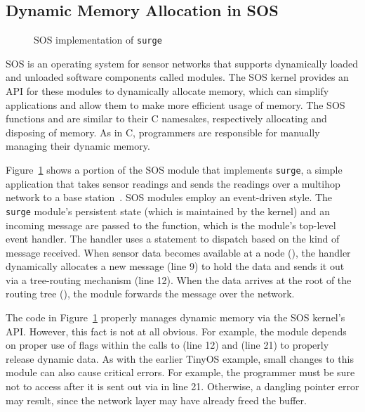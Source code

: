 \subsection{Dynamic Memory Allocation in SOS}



\begin{figure}[t]

\caption{SOS implementation of {\tt surge}\label{fig:surge}}
\end{figure}



SOS is an operating system for sensor networks that supports dynamically
loaded and unloaded software components called modules.
%
The SOS kernel provides an API for these modules to dynamically allocate
memory, which can simplify applications and allow them to make more
efficient usage of memory.
%
The SOS functions  and  are similar to
their C namesakes, respectively allocating and disposing of memory.  
%
As in C, programmers are responsible for manually managing their dynamic
memory.  



Figure~\ref{fig:surge} shows a portion of the SOS module that implements
{\tt surge}, a simple application that takes sensor readings and sends the
readings over a multihop network to a base station~\cite{nesC}.  
%
SOS modules employ an event-driven style.  
%
The {\tt surge} module's persistent state (which is maintained by the
kernel) and an incoming message are passed to the 
function, which is the module's top-level event handler.  
%
The handler uses a  statement to dispatch based on the kind of
message received.  
%
When sensor data becomes available at a node (), the
handler dynamically allocates a new message (line 9) to hold the data and
sends it out via a tree-routing mechanism (line 12).  
%
When the data arrives at the root of the routing tree
(), the module forwards the message over the
network.



The code in Figure~\ref{fig:surge} properly manages dynamic memory via the
SOS kernel's API.  
%
However, this fact is not at all obvious.  
%
For example, the module depends on proper use of flags within the calls to
 (line 12) and  (line 21) to properly
release dynamic data.
%
As with the earlier TinyOS example, small changes to this module can also
cause critical errors.  
%
For example, the programmer must be sure not to access  after
it is sent out via  in line 21.  
%
Otherwise, a dangling pointer error may result, since the network layer may
have already freed the buffer. 



